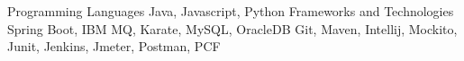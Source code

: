 





\begin{cvskills}
    \cvskill
        {Programming Languages}
        {Java, Javascript, Python}
    \cvskill
        {Frameworks and Technologies}
        {Spring Boot, IBM MQ, Karate, MySQL, OracleDB}
        {Git, Maven, Intellij, Mockito, Junit, Jenkins, Jmeter, Postman, PCF}
\end{cvskills}